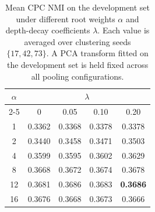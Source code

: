 \begin{table}[t]
\centering
\small
\setlength{\tabcolsep}{4pt}
\renewcommand{\arraystretch}{1.12}
\caption{Mean CPC NMI on the development set under different root weights $\alpha$ and depth-decay coefficients $\lambda$. Each value is averaged over clustering seeds $\{17,42,73\}$. A PCA transform fitted on the development set is held fixed across all pooling configurations.}
\label{tab:claimsem_sensitivity}
\begin{tabular}{@{}ccccc@{}}
\toprule
\multirow{2}{*}{$\alpha$}
& \multicolumn{4}{c}{$\lambda$} \\
\cmidrule(lr){2-5}
& 0 & 0.05 & 0.10 & 0.20 \\
\midrule
1 & 0.3362 & 0.3368 & 0.3378 & 0.3378 \\
2 & 0.3440 & 0.3458 & 0.3471 & 0.3503 \\
4 & 0.3599 & 0.3595 & 0.3602 & 0.3629 \\
8 & 0.3668 & 0.3672 & 0.3674 & 0.3678 \\
12 & 0.3681 & 0.3686 & 0.3683 & \textbf{0.3686} \\
16 & 0.3676 & 0.3668 & 0.3673 & 0.3666 \\
\bottomrule
\end{tabular}
\end{table}
